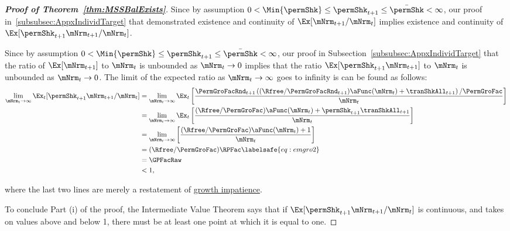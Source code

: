 \documentclass[\econtexRoot/BufferStockTheory]{subfiles}
\begin{document}
\begin{proof}[\textbf{Proof of Theorem~\ref{thm:MSSBalExists}}]

Since by assumption $ 0 < \Min{\permShk} \leq \permShk_{t+1} \leq \bar{\permShk} < \infty$, our proof in~\ref{subsubsec:AppxIndividTarget} that demonstrated existence and continuity of $\Ex[\mNrm_{t+1}/\mNrm_{t}]$ implies existence and continuity of $\Ex[\permShk_{t+1}\mNrm_{t+1}/\mNrm_{t}]$.



Since by assumption $ 0 < \Min{\permShk} \leq \permShk_{t+1} \leq \bar{\permShk} < \infty$, our proof in Subsection~\ref{subsubsec:AppxIndividTarget} that the ratio of $\Ex[\mNrm_{t+1}]$ to $\mNrm_{t}$ is unbounded as $\mNrm_{t} \rightarrow 0$ implies that the ratio $\Ex[\permShk_{t+1}\mNrm_{t+1}]$ to $\mNrm_{t}$ is unbounded as $\mNrm_{t} \rightarrow 0$.
The limit of the expected ratio as $\mNrm_{t}\rightarrow \infty$ goes to infinity is can be found as follows:
%
\begin{align}
  \lim_{\mNrm_{t} \rightarrow \infty} \Ex_{t}[\permShk_{t+1}\mNrm_{t+1}/\mNrm_{t}]  & =   
                                                                  \lim_{\mNrm_{t} \rightarrow \infty} 
                                                                  \Ex_{t}\left[\frac{\PermGroFacRnd_{t+1}\left((\Rfree/\PermGroFacRnd_{t+1})\aFunc(\mNrm_{t})+{\tranShkAll}_{t+1}\right)/\PermGroFac}{\mNrm_{t}}\right] \notag 
  \\   & =   \lim_{\mNrm_{t} \rightarrow \infty} \Ex_{t}\left[
         \frac{(\Rfree/\PermGroFac)\aFunc(\mNrm_{t})+\permShk_{t+1}{\tranShkAll}_{t+1}}{\mNrm_{t}}
         \right] \notag 
  \\   & =   \lim_{\mNrm_{t} \rightarrow \infty} \left[
         \frac{(\Rfree/\PermGroFac)\aFunc(\mNrm_{t})+1}{\mNrm_{t}}
         \right] \notag 
  \\  & = (\Rfree/\PermGroFac)\RPFac \labelsafe{eq:emgro2}
  \\  & = \GPFacRaw \notag
  \\  & < 1, \notag
\end{align}

where the last two lines are merely a restatement of \hyperlink{GIC}{growth impatience}.


To conclude Part (i) of the proof, the Intermediate Value Theorem says that if $\Ex[\permShk_{t+1}\mNrm_{t+1}/\mNrm_t]$ is continuous, and takes on values above and below 1, there must be at least one point at which it is equal to one.


\end{proof}
\end{document}
